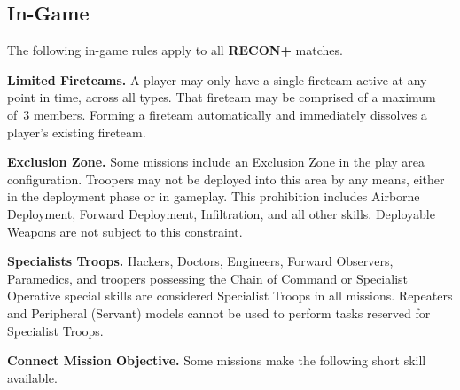 \documentclass[14pt,dvipsnames]{extarticle}
\newcommand{\missionrule}[1]{\noindent\textbf{#1}\xspace}
\newenvironment{squishitemize}
{\begin{list}{$\bullet$}{%
    \setlength{\itemsep}{2pt}%
    \setlength{\parsep}{2pt}%
    \setlength{\topsep}{2pt}%
    \setlength{\parskip}{0pt} %
    \renewcommand{\labelitemi}{--}}}
  {\end{list}}
\newcommand{\reconplus}{\textbf{RECON+}\xspace}
\begin{document}


\subsection{In-Game}

The following in-game rules apply to all \reconplus matches.


\missionrule{Limited Fireteams.}  A player may only have a single
fireteam active at any point in time, across all types.  That fireteam
may be comprised of a maximum of~3 members.  Forming a fireteam
automatically and immediately dissolves a player's existing fireteam.

\pagebreak
\missionrule{Exclusion Zone.}  Some missions include an Exclusion Zone
in the play area configuration.  Troopers may not be deployed into
this area by any means, either in the deployment phase or in gameplay.
This prohibition includes Airborne Deployment, Forward Deployment,
Infiltration, and all other skills.  Deployable Weapons are not
subject to this constraint.

\missionrule{Specialists Troops.}  Hackers, Doctors, Engineers,
Forward Observers, Paramedics, and troopers possessing the Chain of
Command or Specialist Operative special skills are considered
Specialist Troops in all missions.  Repeaters and Peripheral (Servant)
models cannot be used to perform tasks reserved for Specialist Troops.

\missionrule{Connect Mission Objective.} Some missions make the
following short skill available.
\label{sec:hack-objective}
\end{document}

